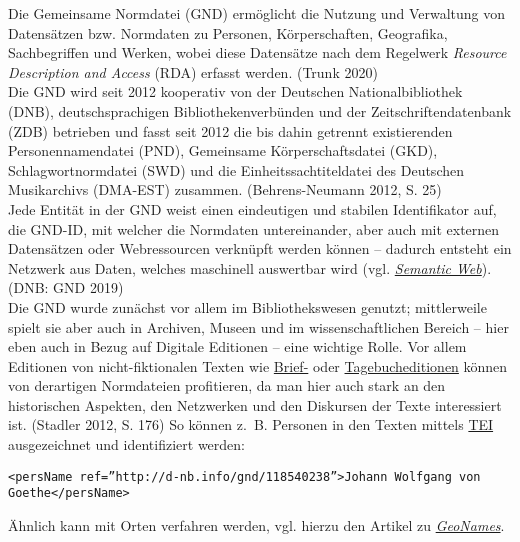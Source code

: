 \documentclass{article}
\begin{document}
    Die Gemeinsame Normdatei (GND) ermöglicht die Nutzung und Verwaltung von Datensätzen bzw. Normdaten zu Personen, Körperschaften, Geografika, Sachbegriffen und Werken, wobei diese Datensätze nach dem Regelwerk \emph{Resource Description and Access} (RDA) erfasst werden. (Trunk 2020)\\
            
        Die GND wird seit 2012 kooperativ von der Deutschen Nationalbibliothek (DNB), deutschsprachigen Bibliothekenverbünden und der Zeitschriftendatenbank (ZDB) betrieben und fasst seit 2012 die bis dahin getrennt existierenden Personennamendatei (PND), Gemeinsame Körperschaftsdatei (GKD), Schlagwortnormdatei (SWD) und die Einheitssachtiteldatei des Deutschen Musikarchivs (DMA-EST) zusammen. (Behrens-Neumann 2012, S. 25)\\
            
        Jede Entität in der GND weist einen eindeutigen und stabilen Identifikator auf, die GND-ID, mit welcher die Normdaten untereinander, aber auch mit externen Datensätzen oder Webressourcen verknüpft werden können – dadurch entsteht ein Netzwerk aus Daten, welches maschinell auswertbar wird (vgl. \emph{\href{http://gams.uni-graz.at/o:konde.167}{Semantic Web}}). (DNB: GND 2019)\\
            
        Die GND wurde zunächst vor allem im Bibliothekswesen genutzt; mittlerweile spielt sie aber auch in Archiven, Museen und im wissenschaftlichen Bereich – hier eben auch in Bezug auf Digitale Editionen – eine wichtige Rolle. Vor allem Editionen von nicht-fiktionalen Texten wie \href{http://gams.uni-graz.at/o:konde.39}{Brief-} oder \href{http://gams.uni-graz.at/o:konde.175}{Tagebucheditionen} können von derartigen Normdateien profitieren, da man hier auch stark an den historischen Aspekten, den Netzwerken und den Diskursen der Texte interessiert ist. (Stadler 2012, S. 176) So können z. B. Personen in den Texten mittels \href{http://gams.uni-graz.at/o:konde.178}{TEI} ausgezeichnet und identifiziert werden:\\
            
        \begin{verbatim}<persName ref=”http://d-nb.info/gnd/118540238”>Johann Wolfgang von Goethe</persName>\end{verbatim}Ähnlich kann mit Orten verfahren werden, vgl. hierzu den Artikel zu \emph{\href{http://gams.uni-graz.at/o:konde.107}{GeoNames}}.\\
            
\end{document}
